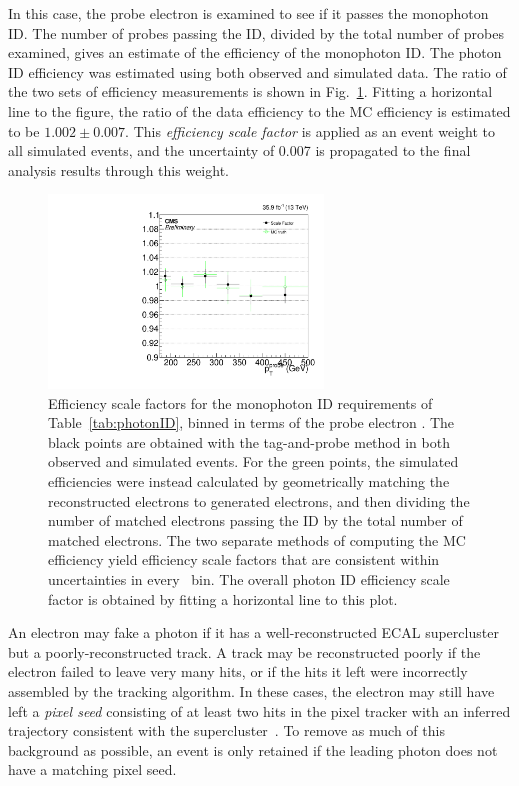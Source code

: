 In this case, the probe electron is examined to see if it passes the monophoton ID. The number of probes passing the ID, divided by the total number of probes examined, gives an estimate of the efficiency
of the monophoton ID. The photon ID efficiency was estimated using both observed and simulated data. The ratio of the two sets of efficiency measurements is shown in Fig.~\ref{fig:phoID_SF}.
Fitting a horizontal line to the figure, the ratio of the data efficiency to the MC efficiency is estimated to be $1.002 \pm 0.007$. This \textit{efficiency scale factor} is applied as an event
weight to all simulated events, and the uncertainty of 0.007 is propagated to the final analysis results through this weight.

\begin{figure}[hbtp]
  \begin{center}
    \includegraphics[width=0.65\textwidth]{Figures/phoID_SF.pdf}
    \caption{
    Efficiency scale factors for the monophoton ID requirements of Table~\ref{tab:photonID}, binned in terms of the probe electron \pT. The black points are obtained with the tag-and-probe method in
    both observed and simulated events. For the green points, the simulated efficiencies were instead calculated by geometrically matching the reconstructed electrons to generated electrons,
    and then dividing the number of matched electrons passing the ID by the total number of matched electrons. The two separate methods of computing the MC efficiency yield
    efficiency scale factors that are consistent within uncertainties in every \pT\ bin. The overall photon ID efficiency scale factor is obtained by fitting a horizontal line to this plot.
    }
    \label{fig:phoID_SF}
  \end{center}
\end{figure}

An electron may fake a photon if it has a well-reconstructed ECAL supercluster but a poorly-reconstructed track. A track may be reconstructed poorly if the electron failed to leave very many hits,
or if the hits it left were incorrectly assembled by the tracking algorithm. In these cases, the electron may still have left a \textit{pixel seed} consisting of at least two hits in the pixel tracker
with an inferred trajectory consistent with the supercluster~\cite{ref:1748-0221/10/08/P08010}. To remove as much of this background as possible, an event is only retained if the leading photon does
not have a matching pixel seed.

